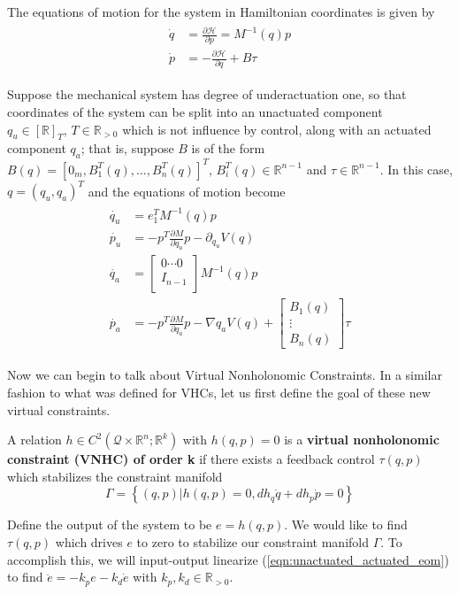 The equations of motion for the system in Hamiltonian coordinates is given by
\begin{align}\label{eqn:hamiltionian_eom}
\begin{split}
\dot{q} &= \frac{\partial \mathcal{H}}{\partial p} = M^{-1}(q) p \\
\dot{p} &= -\frac{\partial \mathcal{H}}{\partial q} + B \tau
\end{split}
\end{align}

Suppose the mechanical system has degree of underactuation one, so that coordinates of the system can be split into an unactuated component \(q_u \in [\mathbb{R}]_T, \, T \in \mathbb{R}_{>0}\) which is not influence by control, along with an actuated component \(q_a\); that is, suppose \(B\) is of the form \(B(q) = [0_m, B_1^T(q), \ldots, B_n^T(q)]^T, \, B_i^T(q) \in \mathbb{R}^{n-1}\) and \(\tau \in \mathbb{R}^{n-1}\). In this case, \(q = (q_u, q_a)^T\) and the equations of motion become
\begin{align}\label{eqn:unactuated_actuated_eom}
\begin{split}
\dot{q_u} &= e_1^T M^{-1}(q) p \\
\dot{p_u} &= -p^T\frac{\partial M}{\partial q_u} p - \partial_{q_u}V(q) \\
\dot{q_a} &= 
\begin{bmatrix}
0 \cdots 0 \\
I_{n-1} \\
\end{bmatrix} M^{-1}(q) p \\
\dot{p_a} &= -p^T\frac{\partial M}{\partial q_a} p - \nabla{q_a}V(q) + 
\begin{bmatrix}
B_1(q) \\
\vdots \\
B_n(q)
\end{bmatrix} \tau
\end{split}
\end{align}

Now we can begin to talk about Virtual Nonholonomic Constraints. In a similar fashion to what was defined for VHCs, let us first define the goal of these new virtual constraints.

\begin{defn}
A relation \(h \in C^2\left(\mathcal{Q}\times \mathbb{R}^n ; \mathbb{R}^k\right)\) with \(h(q,p) = 0\) is a \textbf{virtual nonholonomic constraint (VNHC) of order k} if there exists a feedback control \(\tau(q,p)\) which stabilizes the constraint manifold
\[
\Gamma = \left\{(q,p) | h(q,p) = 0, dh_q \dot{q} + dh_p \dot{p} = 0\right\}
\]
\end{defn}
Define the output of the system to be \(e = h(q,p)\). We would like to find \(\tau(q,p)\) which drives \(e\) to zero to stabilize our constraint manifold \(\Gamma\). To accomplish this, we will input-output linearize (\ref{eqn:unactuated_actuated_eom}) to find \(\ddot{e} = -k_p e - k_d \dot{e}\) with \(k_p, k_d \in \mathbb{R}_{> 0}\).

